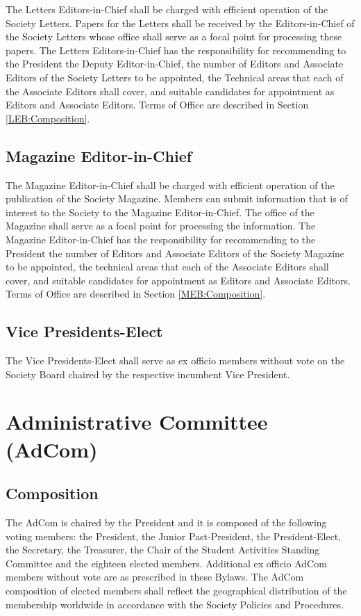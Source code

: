 \documentclass[10pt]{article}
\newcommand{\secref}[1]{Section \ref{#1}}
\begin{document}
The Letters Editors-in-Chief shall be charged with efficient operation of the Society Letters.  Papers for the Letters shall be received by the Editors-in-Chief of the Society Letters whose office shall serve as a focal point for processing these papers.  The Letters Editors-in-Chief has the responsibility for recommending to the President the Deputy Editor-in-Chief, the number of Editors and Associate Editors of the Society Letters to be appointed, the Technical areas that each of the Associate Editors shall cover, and suitable candidates for appointment as Editors and Associate Editors. Terms of Office are described in \secref{LEB:Composition}.


\subsection{Magazine Editor-in-Chief}

The Magazine Editor-in-Chief shall be charged with efficient operation of the publication of the Society Magazine. Members can submit information that is of interest to the Society to the Magazine Editor-in-Chief. The office of the Magazine shall serve as a focal point for processing the information. The Magazine Editor-in-Chief has the responsibility for recommending to the President the number of Editors and Associate Editors of the Society Magazine to be appointed, the technical areas that each of the Associate Editors shall cover, and suitable candidates for appointment as Editors and Associate Editors. Terms of Office are described in \secref{MEB:Composition}. 


\subsection{Vice Presidents-Elect}

The Vice Presidents-Elect shall serve as ex officio members without vote on the Society Board chaired by the respective incumbent Vice President.


\section{Administrative Committee (AdCom)}
\label{AdCom}

\subsection{Composition}
\label{AdCom:Composition}

The AdCom is chaired by the President and it is composed of the following voting members: the President, the Junior Past-President, the President-Elect, the Secretary, the Treasurer, the Chair of the Student Activities Standing Committee and the eighteen elected members.  Additional ex officio AdCom members without vote are as prescribed in these Bylaws. The AdCom composition of elected members shall reflect the geographical distribution of the membership worldwide in accordance with the Society Policies and Procedures.
\end{document}
